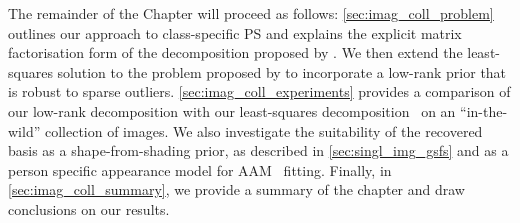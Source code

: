 The remainder of the Chapter will proceed as follows: \cref{sec:imag_coll_problem}
outlines our approach to class-specific PS and explains the explicit matrix
factorisation form of the decomposition proposed by
\citet{KemelmacherShlizerman:2013iv}. We then extend the least-squares
solution to the problem proposed by \citet{KemelmacherShlizerman:2013iv} to
incorporate a low-rank prior that is robust to sparse outliers.
\cref{sec:imag_coll_experiments} provides a comparison of our low-rank
decomposition with our least-squares decomposition~\cite{KemelmacherShlizerman:2013iv}
on an ``in-the-wild'' collection of images. We also investigate the suitability
of the recovered basis as a shape-from-shading prior, as described in
\cref{sec:singl_img_gsfs} and as a person specific appearance model for
AAM~\cite{cootes2001active} fitting. Finally, in \cref{sec:imag_coll_summary},
we provide a summary of the chapter and draw conclusions on our results.



\stopcontents[chapters]
